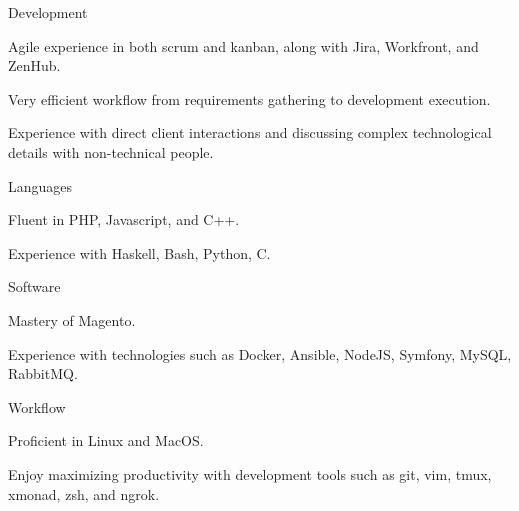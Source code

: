 \begin{cvskills}
  \cvskill
    {Development}
    {
      \begin{cvitems}
        \item Agile experience in both scrum and kanban, along with Jira, Workfront, and ZenHub.
        \item Very efficient workflow from requirements gathering to development execution.
        \item Experience with direct client interactions and discussing complex technological details with non-technical people.
      \end{cvitems}
    }
  \cvskill
    {Languages}
    {
      \begin{cvitems}
        \item Fluent in PHP, Javascript, and C++.
        \item Experience with Haskell, Bash, Python, C.
      \end{cvitems}
    }
  \cvskill
    {Software}
    {
      \begin{cvitems}
        \item Mastery of Magento.
        \item Experience with technologies such as Docker, Ansible, NodeJS, Symfony, MySQL, RabbitMQ.
      \end{cvitems}
    }
  \cvskill
    {Workflow}
    {
      \begin{cvitems}
        \item Proficient in Linux and MacOS.
        \item Enjoy maximizing productivity with development tools such as git, vim, tmux, xmonad, zsh, and ngrok.
      \end{cvitems}
    }
\end{cvskills}
